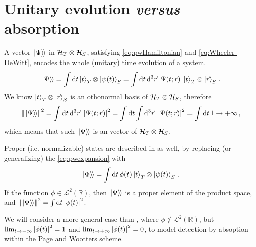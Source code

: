\section{Unitary evolution \emph{versus} absorption}

A vector $\left.\left| \Psi \right\rangle\hspace{-0.115em}\right\rangle$ in $\mathcal{H}_T \otimes \mathcal{H}_S$,
satisfying \eqref{eq:pwHamiltonian} and \eqref{eq:Wheeler-DeWitt},
encodes the whole (unitary) time evolution of a system.
\begin{equation}\label{eq:pwexpansion}
  \left.\left| \Psi \right\rangle\hspace{-0.115em}\right\rangle =
    \int \dd{t} \ket{t}_T \otimes \ket{\psi(t)}_S =
    \int \dd{t}\dd[3]{\vec{r}} \ \Psi(t; \vec{r}) \; \ket{t}_T \otimes \ket{\vec{r}}_S
    \,  \text{.}
\end{equation}
We know $\ket{t}_T \otimes \ket{\vec{r}}_S$ is an othonormal basis of $\mathcal{H}_T \otimes \mathcal{H}_S$, therefore
\begin{equation}
  \norm{\left.\left| \Psi \right\rangle\hspace{-0.115em}\right\rangle}^2 =
    \int \dd{t}\dd[3]{\vec{r}} \ \abs{\Psi(t; \vec{r})}^2 =
    \int \dd{t} \int \dd[3]{\vec{r}} \ \abs{\Psi(t; \vec{r})}^2 =
    \int \dd{t} 1 \rightarrow +\infty
    \,  \text{,}
\end{equation}
which means that such $\left.\left| \Psi \right\rangle\hspace{-0.115em}\right\rangle$ is an  vector of $\mathcal{H}_T \otimes \mathcal{H}_S$.

Proper (i.e. normalizable) states are described in \cite{Lloyd:Time} as well, by replacing (or generalizing)
the \eqref{eq:pwexpansion} with
\begin{equation}\label{eq:pwphi}
  \left.\left| \Phi \right\rangle\hspace{-0.115em}\right\rangle =
    \int \dd{t} \phi(t) \ket{t}_T \otimes \ket{\psi(t)}_S \, \text{.}
\end{equation}
If the function $\phi \in \mathcal{L}^2(\mathbb{R})$,
then $\left.\left| \Psi \right\rangle\hspace{-0.115em}\right\rangle$ is a proper element of the product space,
and $\norm{\left.\left| \Psi \right\rangle\hspace{-0.115em}\right\rangle}^2 = \int \dd{t} \abs{\phi(t)}^2$.

We will consider a more general case than \cite{Lloyd:Time},
where $\phi \notin \mathcal{L}^2(\mathbb{R})$, but
$\lim_{t \to -\infty} \abs{\phi(t)}^2 = 1$ and
$\lim_{t \to +\infty} \abs{\phi(t)}^2 = 0$,
to model detection by absoption \parencite{RuschhauptAbsorption}
within the Page and Wootters scheme.


